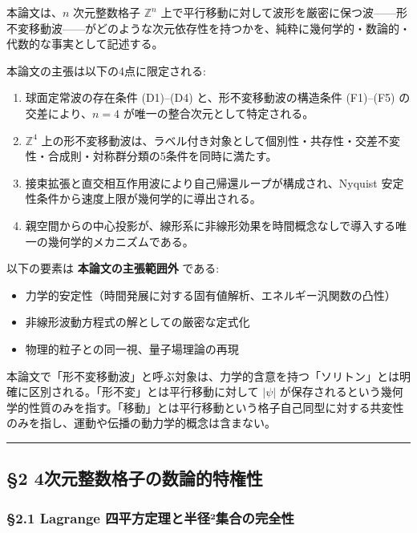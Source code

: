 \documentclass[
  a4paper,11pt]{ltjsarticle}
\providecommand{\tightlist}{%
  \setlength{\itemsep}{0pt}\setlength{\parskip}{0pt}}
\theoremstyle{definition}
\theoremstyle{remark}
\begin{document}
本論文は、\(n\) 次元整数格子 \(\mathbb{Z}^n\)
上で平行移動に対して波形を厳密に保つ波------形不変移動波------がどのような次元依存性を持つかを、純粋に幾何学的・数論的・代数的な事実として記述する。

本論文の主張は以下の4点に限定される:

\begin{enumerate}
\def\labelenumi{\arabic{enumi}.}
\tightlist
\item
  球面定常波の存在条件 (D1)--(D4) と、形不変移動波の構造条件 (F1)--(F5)
  の交差により、\(n = 4\) が唯一の整合次元として特定される。
\item
  \(\mathbb{Z}^4\)
  上の形不変移動波は、ラベル付き対象として個別性・共存性・交差不変性・合成則・対称群分類の5条件を同時に満たす。
\item
  接束拡張と直交相互作用波により自己帰還ループが構成され、Nyquist
  安定性条件から速度上限が幾何学的に導出される。
\item
  親空間からの中心投影が、線形系に非線形効果を時間概念なしで導入する唯一の幾何学的メカニズムである。
\end{enumerate}

以下の要素は \textbf{本論文の主張範囲外} である:

\begin{itemize}
\tightlist
\item
  力学的安定性（時間発展に対する固有値解析、エネルギー汎関数の凸性）
\item
  非線形波動方程式の解としての厳密な定式化
\item
  物理的粒子との同一視、量子場理論の再現
\end{itemize}

本論文で「形不変移動波」と呼ぶ対象は、力学的含意を持つ「ソリトン」とは明確に区別される。「形不変」とは平行移動に対して
\(|\psi|\)
が保存されるという幾何学的性質のみを指す。「移動」とは平行移動という格子自己同型に対する共変性のみを指し、運動や伝播の動力学的概念は含まない。

\begin{center}\rule{0.5\linewidth}{0.5pt}\end{center}

\subsection{§2
4次元整数格子の数論的特権性}\label{ux6b21ux5143ux6574ux6570ux683cux5b50ux306eux6570ux8ad6ux7684ux7279ux6a29ux6027}

\subsubsection{§2.1 Lagrange
四平方定理と半径²集合の完全性}\label{lagrange-ux56dbux5e73ux65b9ux5b9aux7406ux3068ux534aux5f84uxb2ux96c6ux5408ux306eux5b8cux5168ux6027}
\end{document}
